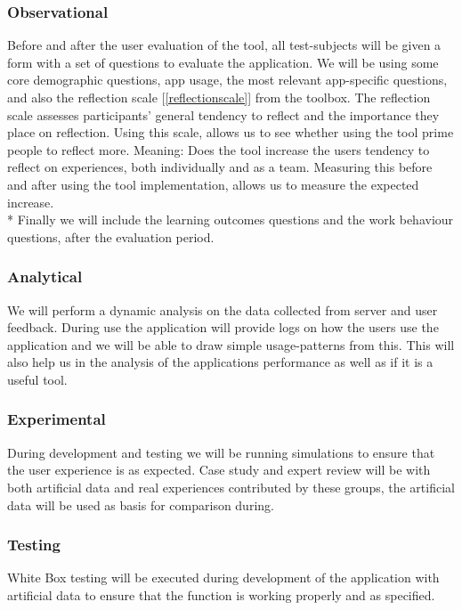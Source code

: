 \subsubsection{Observational}
Before and after the user evaluation of the tool, all test-subjects will be given a form with a set of questions to evaluate the application. We will be using some core demographic questions, app usage, the most relevant app-specific questions, and also the reflection scale [\ref{reflectionscale}] from the toolbox. The reflection scale assesses participants' general tendency to reflect and the importance they place on reflection. Using this scale, allows us to see whether using the tool prime people to reflect more. Meaning: Does the tool increase the users tendency to reflect on experiences, both individually and as a team. Measuring this before and after using the tool implementation, allows us to measure the expected increase. \\*
Finally we will include the learning outcomes questions and the work behaviour questions, after the evaluation period.  

\subsubsection{Analytical}
We will perform a dynamic analysis on the data collected from server and user feedback. During use the application will provide logs on how the users use the application and we will be able to draw simple usage-patterns from this. This will also help us in the analysis of the applications performance as well as if it is a useful tool.

\subsubsection{Experimental}
During development and testing we will be running simulations to ensure that the user experience is as expected. Case study and expert review will be with both artificial data and real experiences contributed by these groups, the artificial data will be used as basis for comparison during.

\subsubsection{Testing}
White Box testing will be executed during development of the application with artificial data to ensure that the function is working properly and as specified.

